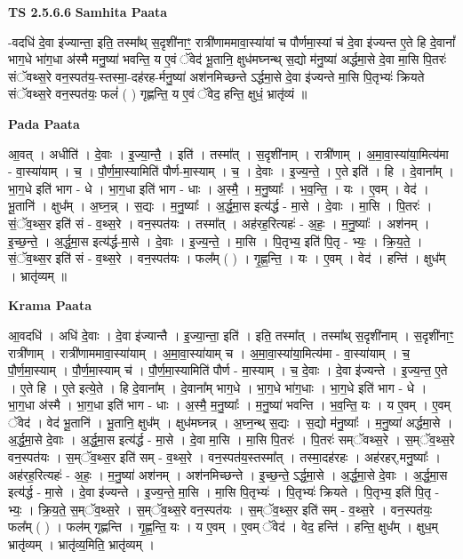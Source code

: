 \documentclass[17pt]{extarticle}
\begin{document}
\textbf{TS 2.5.6.6 } \newline
\textbf{Samhita Paata} \newline

-वदधि॑ दे॒वा इ॑ज्यान्ता॒ इति॒ तस्मा᳚थ् स॒दृशी॑नाꣳ॒॒ रात्री॑णाममावा॒स्या॑यां च पौर्णमा॒स्यां च॑ दे॒वा इ॑ज्यन्त ए॒ते हि दे॒वानां᳚ भाग॒धे भा॑ग॒धा अ॑स्मै मनु॒ष्या॑ भवन्ति॒ य ए॒वं ॅवेद॑ भू॒तानि॒ क्षुध॑मघ्नन्थ् स॒द्यो म॑नु॒ष्या॑ अर्द्धमा॒से दे॒वा मा॒सि पि॒तरः॑ संॅवथ्स॒रे वन॒स्पत॑य॒-स्तस्मा॒-दह॑रह-र्मनु॒ष्या॑ अश॑नमिच्छन्ते ऽर्द्धमा॒से दे॒वा इ॑ज्यन्ते मा॒सि पि॒तृभ्यः॑ क्रियते संॅवथ्स॒रे वन॒स्पत॑यः॒ फलं॑ ( ) गृह्णन्ति॒ य ए॒वं ॅवेद॒ हन्ति॒ क्षुधं॒ भ्रातृ॑व्यं ॥ \newline

\textbf{Pada Paata} \newline

आ॒वत् । अधीति॑ । दे॒वाः । इ॒ज्या॒न्तै॒ । इति॑ । तस्मा᳚त् । स॒दृशी॑नाम् । रात्री॑णाम् । अ॒मा॒वा॒स्या॑या॒मित्य॑मा - वा॒स्या॑याम् । च॒ । पौ॒र्ण॒मा॒स्यामिति॑ पौर्ण-मा॒स्याम् । च॒ । दे॒वाः । इ॒ज्य॒न्ते॒ । ए॒ते इति॑ । हि । दे॒वाना᳚म् । भा॒ग॒धे इति॑ भाग - धे । भा॒ग॒धा इति॑ भाग - धाः । अ॒स्मै॒ । म॒नु॒ष्याः᳚ । भ॒व॒न्ति॒ । यः । ए॒वम् । वेद॑ । भू॒तानि॑ । क्षुध᳚म् । अ॒घ्न॒न्न् । स॒द्यः । म॒नु॒ष्याः᳚ । अ॒र्द्ध॒मा॒स इत्य॑र्द्ध - मा॒से । दे॒वाः । मा॒सि । पि॒तरः॑ । सं॒ॅव॒थ्स॒र इति॑ सं - व॒थ्स॒रे । वन॒स्पत॑यः । तस्मा᳚त् । अह॑रह॒रित्यहः॑ - अ॒हः॒ । म॒नु॒ष्याः᳚ । अश॑नम् । इ॒च्छ॒न्ते॒ । अ॒र्द्ध॒मा॒स इत्य॑र्द्ध-मा॒से । दे॒वाः । इ॒ज्य॒न्ते॒ । मा॒सि । पि॒तृभ्य॒ इति॑ पि॒तृ - भ्यः॒ । क्रि॒य॒ते॒ । सं॒ॅव॒थ्स॒र इति॑ सं - व॒थ्स॒रे । वन॒स्पत॑यः । फल᳚म् ( ) । गृ॒ह्ण॒न्ति॒ । यः । ए॒वम् । वेद॑ । हन्ति॑ । क्षुध᳚म् । भ्रातृ॑व्यम् ॥  \newline


\textbf{Krama Paata} \newline

आ॒वदधि॑ । अधि॑ दे॒वाः । दे॒वा इ॑ज्यान्तै । इ॒ज्या॒न्ता॒ इति॑ । इति॒ तस्मा᳚त् । तस्मा᳚थ् स॒दृशी॑नाम् । स॒दृशी॑नाꣳ॒॒ रात्री॑णाम् । रात्री॑णाममावा॒स्या॑याम् । अ॒मा॒वा॒स्या॑याम् च । अ॒मा॒वा॒स्या॑या॒मित्य॑मा - वा॒स्या॑याम् । च॒ पौ॒र्ण॒मा॒स्याम् । पौ॒र्ण॒मा॒स्याम् च॑ । पौ॒र्ण॒मा॒स्यामिति॑ पौर्ण - मा॒स्याम् । च॒ दे॒वाः । दे॒वा इ॑ज्यन्ते । इ॒ज्य॒न्त॒ ए॒ते । ए॒ते हि । ए॒ते इत्ये॒ते । हि दे॒वाना᳚म् । दे॒वाना᳚म् भाग॒धे । भा॒ग॒धे भा॑ग॒धाः । भा॒ग॒धे इति॑ भाग - धे । भा॒ग॒धा अ॑स्मै । भा॒ग॒धा इति॑ भाग - धाः । अ॒स्मै॒ म॒नु॒ष्याः᳚ । म॒नु॒ष्या॑ भवन्ति । भ॒व॒न्ति॒ यः । य ए॒वम् । ए॒वम् ॅवेद॑ । वेद॑ भू॒तानि॑ । भू॒तानि॒ क्षुध᳚म् । क्षुध॑मघ्नन्न् । अ॒घ्न॒न्थ् स॒द्यः । स॒द्यो म॑नु॒ष्याः᳚ । म॒नु॒ष्या॑ अर्द्धमा॒से । अ॒र्द्ध॒मा॒से दे॒वाः । अ॒र्द्ध॒मा॒स इत्य॑र्द्ध - मा॒से । दे॒वा मा॒सि । मा॒सि पि॒तरः॑ । पि॒तरः॑ सम्ॅवथ्स॒रे । स॒म्ॅव॒थ्स॒रे वन॒स्पत॑यः । स॒म्ॅव॒थ्स॒र इति॑ सम् - व॒थ्स॒रे । वन॒स्पत॑य॒स्तस्मा᳚त् । तस्मा॒दह॑रहः । अह॑रहर्,मनु॒ष्याः᳚ । अह॑रह॒रित्यहः॑ - अ॒हः॒ । म॒नु॒ष्या॑ अश॑नम् । अश॑नमिच्छन्ते । इ॒च्छ॒न्ते॒ ऽर्द्ध॒मा॒से । अ॒र्द्ध॒मा॒से दे॒वाः । अ॒र्द्ध॒मा॒स इत्य॑र्द्ध - मा॒से । दे॒वा इ॑ज्यन्ते । इ॒ज्य॒न्ते॒ मा॒सि । मा॒सि पि॒तृभ्यः॑ । पि॒तृभ्यः॑ क्रियते । पि॒तृभ्य॒ इति॑ पि॒तृ - भ्यः॒ । क्रि॒य॒ते॒ स॒म्ॅव॒थ्स॒रे । स॒म्ॅव॒थ्स॒रे वन॒स्पत॑यः । स॒म्ॅव॒थ्स॒र इति॑ सम् - व॒थ्स॒रे । वन॒स्पत॑यः॒ फल᳚म् ( ) । फल॑म् गृह्णन्ति । गृ॒ह्ण॒न्ति॒ यः । य ए॒वम् । ए॒वम् ॅवेद॑ । वेद॒ हन्ति॑ । हन्ति॒ क्षुध᳚म् । क्षुध॒म् भ्रातृ॑व्यम् । भ्रातृ॑व्य॒मिति॒ भ्रातृ॑व्यम् । \newline
\end{document}
